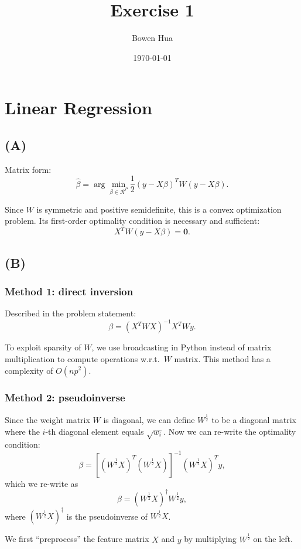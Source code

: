 \documentclass[a4paper,11pt]{article}
\begin{document}
\title{Exercise 1}
\author{Bowen Hua}
\date{\today}
\maketitle

\section{Linear Regression}
\subsection{(A)}
Matrix form:
$$
\hat{\beta} = \arg \min_{\beta \in \mathcal{R}^P} \frac{1}{2} (y - X \beta)^T W(y - X \beta).
$$

Since $W$ is symmetric and positive semidefinite, this is a convex optimization problem. Its first-order optimality condition is necessary and sufficient:
$$
X^TW(y - X\beta) = \bm{0}.
$$
\subsection{(B)}

\subsubsection{Method 1: direct inversion}

Described in the problem statement:
$$
\beta = (X^T W X)^{-1} X^T W y.
 $$

To exploit sparsity of $W$, we use broadcasting in Python instead of matrix multiplication to compute operations w.r.t.\ $W$ matrix. This method has a complexity of $O(np^2)$.
\subsubsection{Method 2: pseudoinverse}

Since the weight matrix $W$ is diagonal, we can define ${W}^{\frac{1}{2}}$ to be a diagonal matrix where the $i$-th diagonal element equals $\sqrt{w_i}$. Now we can re-write the optimality condition:
$$
\beta  = [({W}^{\frac{1}{2}}X)^T  ({W}^{\frac{1}{2}}X)]^{-1}  ({W}^{\frac{1}{2}}X)^T y,
$$
which we re-write as
$$
\beta  = ({W}^{\frac{1}{2}}X)^\dagger {W}^{\frac{1}{2}} y,
$$
where $({W}^{\frac{1}{2}}X)^\dagger$ is the pseudoinverse of ${W}^{\frac{1}{2}}X$.

We first ``preprocess'' the feature matrix $X$ and $y$ by multiplying ${W}^{\frac{1}{2}}$ on the left. 
\end{document}
